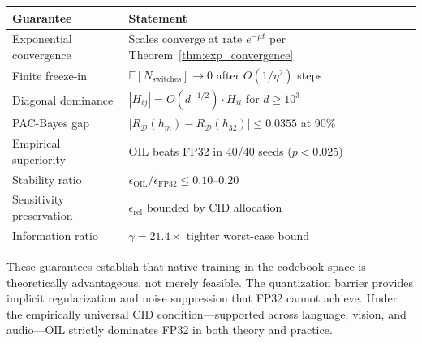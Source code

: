 \begin{center}
\begin{tabular}{ll}
\toprule
\textbf{Guarantee} & \textbf{Statement} \\
\midrule
Exponential convergence & Scales converge at rate $e^{-\mu t}$ per
Theorem~\ref{thm:exp_convergence} \\
Finite freeze-in & $\mathbb{E}[N_{\text{switches}}] \to 0$ after
$O(1/\eta^2)$ steps \\
Diagonal dominance & $|H_{ij}| = O(d^{-1/2}) \cdot H_{ii}$ for $d \geq
10^3$ \\
PAC-Bayes gap & $|R_{\mathcal{D}}(h_m) - R_{\mathcal{D}}(h_{32})| \leq
0.0355$ at 90\% \\
Empirical superiority & OIL beats FP32 in 40/40 seeds ($p < 0.025$) \\
Stability ratio & $\epsilon_{\text{OIL}} / \epsilon_{\text{FP32}} \leq
0.10$--$0.20$ \\
Sensitivity preservation & $\epsilon_{\text{rel}}$ bounded by CID
allocation \\
Information ratio & $\gamma = 21.4\times$ tighter worst-case bound \\
\bottomrule
\end{tabular}
\end{center}

These guarantees establish that native training in the codebook space is
theoretically advantageous, not merely feasible.  The quantization barrier
provides implicit regularization and noise suppression that FP32 cannot
achieve.  Under the empirically universal CID condition---supported across
language, vision, and audio---OIL strictly dominates FP32 in both theory
and practice.
